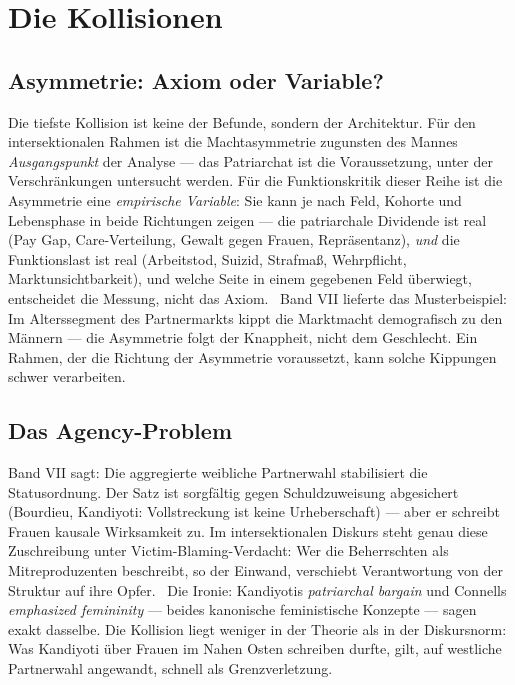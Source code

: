 \section{Die Kollisionen}

\subsection{Asymmetrie: Axiom oder Variable?}

Die tiefste Kollision ist keine der Befunde, sondern der Architektur. Für den
intersektionalen Rahmen ist die Machtasymmetrie zugunsten des Mannes
\emph{Ausgangspunkt} der Analyse --- das Patriarchat ist die Voraussetzung, unter
der Verschränkungen untersucht werden. Für die Funktionskritik dieser Reihe
ist die Asymmetrie eine \emph{empirische Variable}: Sie kann je nach Feld,
Kohorte und Lebensphase in beide Richtungen zeigen --- die patriarchale
Dividende ist real (Pay Gap, Care-Verteilung, Gewalt gegen Frauen,
Repräsentanz), \emph{und} die Funktionslast ist real (Arbeitstod, Suizid,
Strafmaß, Wehrpflicht, Marktunsichtbarkeit), und welche Seite in einem
gegebenen Feld überwiegt, entscheidet die Messung, nicht das Axiom. \plausibel\
Band VII lieferte das Musterbeispiel: Im Alterssegment des Partnermarkts kippt
die Marktmacht demografisch zu den Männern --- die Asymmetrie folgt der
Knappheit, nicht dem Geschlecht. Ein Rahmen, der die Richtung der Asymmetrie
voraussetzt, kann solche Kippungen schwer verarbeiten.

\subsection{Das Agency-Problem}

Band VII sagt: Die aggregierte weibliche Partnerwahl stabilisiert die
Statusordnung. Der Satz ist sorgfältig gegen Schuldzuweisung abgesichert
(Bourdieu, Kandiyoti: Vollstreckung ist keine Urheberschaft) --- aber er
schreibt Frauen kausale Wirksamkeit zu. Im intersektionalen Diskurs steht
genau diese Zuschreibung unter Victim-Blaming-Verdacht: Wer die Beherrschten
als Mitreproduzenten beschreibt, so der Einwand, verschiebt Verantwortung von
der Struktur auf ihre Opfer. \umstritten\ Die Ironie: Kandiyotis
\textit{patriarchal bargain} und Connells \textit{emphasized femininity} ---
beides kanonische feministische Konzepte --- sagen exakt dasselbe. Die Kollision
liegt weniger in der Theorie als in der Diskursnorm: Was Kandiyoti über Frauen
im Nahen Osten schreiben durfte, gilt, auf westliche Partnerwahl angewandt,
schnell als Grenzverletzung.

